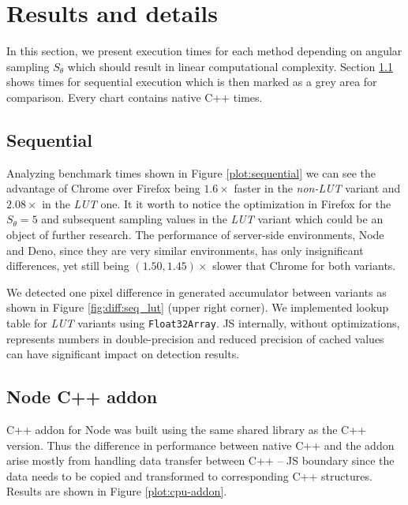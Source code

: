 \section{Results and details}\label{sec:results}
In this section, we present execution times for each method depending on angular sampling $S_\theta$ which should result in linear computational complexity. Section \ref{sec:results:sequential} shows times for sequential execution which is then marked as a grey area for comparison. Every chart contains native C++ times. 

\subsection{Sequential}\label{sec:results:sequential}

Analyzing benchmark times shown in Figure \ref{plot:sequential} we can see the advantage of Chrome over Firefox being $1.6\times$ faster in the \textit{non-LUT} variant and $2.08\times$ in the \textit{LUT} one. It it worth to notice the optimization in Firefox for the $S_\theta=5$ and subsequent sampling values in the \textit{LUT} variant which could be an object of further research. The performance of server-side environments, Node and Deno, since they are very similar environments, has only insignificant differences, yet still being $(1.50, 1.45)\times$ slower that Chrome for both variants.



We detected one pixel difference in generated accumulator between variants as shown in Figure \ref{fig:diff:seq_lut} (upper right corner). We implemented lookup table for \textit{LUT} variants using \texttt{Float32Array}. JS internally, without optimizations, represents numbers in double-precision and reduced precision of cached values can have significant impact on detection results.



\subsection{Node C++ addon}\label{sec:results:cpp-addon}

C++ addon for Node was built using the same shared library as the C++ version. Thus the difference in performance between native C++ and the addon arise mostly from handling data transfer between C++ -- JS boundary since the data needs to be copied and transformed to corresponding C++ structures. Results are shown in Figure \ref{plot:cpu-addon}.

